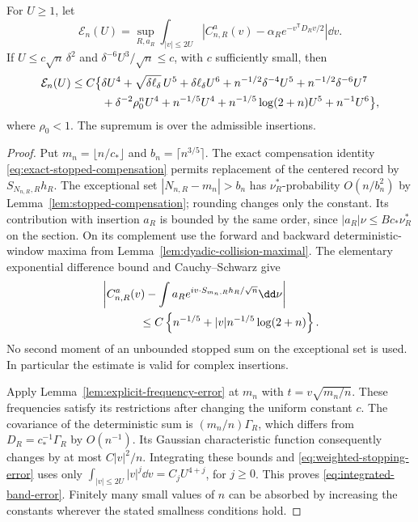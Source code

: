 \begin{proposition}
\label{prop:stopped-band-error}
For $U\ge1$, let
\[
 \mathcal E_n(U)=\sup_{R,a_R}
   \int_{|v|\le2U}
    |C^a_{n,R}(v)-\alpha_Re^{-v^{\mathsf T}D_Rv/2}|\dd v.
\]
If $U\le c\sqrt n\,\delta^2$ and
$\delta^{-6}U^3/\sqrt n\le c$, with $c$ sufficiently small, then
\begin{align}
 \mathcal E_n(U)\le C\bigl\{
 &\delta U^4+\sqrt{\delta\ell_\delta}\,U^5
       +\delta\ell_\delta U^6
       +n^{-1/2}\delta^{-4}U^5+n^{-1/2}\delta^{-6}U^7
       \notag\\
 &+\delta^{-2}\rho_0^nU^4
       +n^{-1/5}U^4+n^{-1/5}\log(2+n)U^5+n^{-1}U^6
                          \bigr\},\label{eq:integrated-band-error}
\end{align}
where $\rho_0<1$. The supremum is over the admissible insertions.
\end{proposition}
\begin{proof}
Put $m_n=\lfloor n/c_*\rfloor$ and $b_n=\lceil n^{3/5}\rceil$.
The exact compensation identity \eqref{eq:exact-stopped-compensation}
permits replacement of the centered record by $S_{N_{n,R},R}h_R$.
The exceptional set $|N_{n,R}-m_n|>b_n$ has $\nu_R^*$-probability
$O(n/b_n^2)$ by Lemma~\ref{lem:stopped-compensation}; rounding changes
only the constant. Its contribution with insertion $a_R$ is bounded
by the same order, since $|a_R|\nu\le Bc_*\nu_R^*$ on the section.
On its complement use the forward and backward deterministic-window
maxima from Lemma~\ref{lem:dyadic-collision-maximal}. The elementary
exponential difference bound and Cauchy--Schwarz give
\begin{align}
 &\left|C^a_{n,R}(v)
       -\int a_R e^{iv\cdot S_{m_n,R}h_R/\sqrt n}\dd\nu\right|
       \notag\\
 &\hspace{12mm}\le C\left\{n^{-1/5}
                  +|v|n^{-1/5}\log(2+n)\right\}.
                 \label{eq:weighted-stopping-error}
\end{align}
No second moment of an unbounded stopped sum on the exceptional set
is used. In particular the estimate is valid for complex insertions.

Apply Lemma~\ref{lem:explicit-frequency-error} at $m_n$ with
$t=v\sqrt{m_n/n}$. These frequencies satisfy its restrictions after
changing the uniform constant $c$. The covariance of the deterministic
sum is $(m_n/n)\Gamma_R$, which differs from $D_R=c_*^{-1}\Gamma_R$
by $O(n^{-1})$. Its Gaussian characteristic function consequently
changes by at most $C|v|^2/n$. Integrating these bounds and
\eqref{eq:weighted-stopping-error} uses only
$\int_{|v|\le2U}|v|^j\dd v=C_jU^{4+j}$, for $j\ge0$.
This proves \eqref{eq:integrated-band-error}. Finitely many small values
of $n$ can be absorbed by increasing the constants wherever the stated
smallness conditions hold.
\end{proof}


